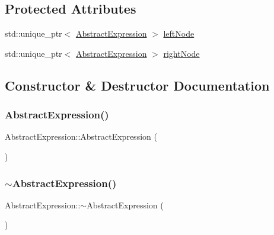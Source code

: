 \subsection*{Protected Attributes}
\begin{DoxyCompactItemize}
\item 
std\+::unique\+\_\+ptr$<$ \mbox{\hyperlink{class_abstract_expression}{Abstract\+Expression}} $>$ \mbox{\hyperlink{class_abstract_expression_aa68e09e96486147d27ed0ce807e97bc3}{left\+Node}}
\item 
std\+::unique\+\_\+ptr$<$ \mbox{\hyperlink{class_abstract_expression}{Abstract\+Expression}} $>$ \mbox{\hyperlink{class_abstract_expression_a13e652b679ff14698b789056b4de92e0}{right\+Node}}
\end{DoxyCompactItemize}


\subsection{Constructor \& Destructor Documentation}
\mbox{\label{class_abstract_expression_a1735b3f7800dcc9a9da422ecb3cb6baf}} 
\subsubsection{\texorpdfstring{AbstractExpression()}{AbstractExpression()}}
{\footnotesize\ttfamily Abstract\+Expression\+::\+Abstract\+Expression (\begin{DoxyParamCaption}{ }\end{DoxyParamCaption})}

\mbox{\label{class_abstract_expression_a24a320f9733fb17f444432d01a3d006f}} 
\subsubsection{\texorpdfstring{$\sim$AbstractExpression()}{~AbstractExpression()}}
{\footnotesize\ttfamily Abstract\+Expression\+::$\sim$\+Abstract\+Expression (\begin{DoxyParamCaption}{ }\end{DoxyParamCaption})\hspace{0.3cm}{\ttfamily [virtual]}}



